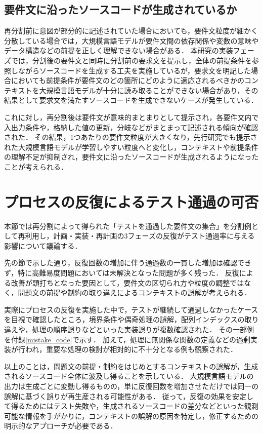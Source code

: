 \documentclass[11pt]{jreport}
\begin{document}
\subsection{要件文に沿ったソースコードが生成されているか}
再分割前に意図が部分的に記述されていた場合においても，要件文粒度が細かく分散している場合では，大規模言語モデルが要件文間の依存関係や変数の意味やデータ構造などの前提を正しく理解できない場合がある．
本研究の実装フェーズでは，分割後の要件文と同時に分割前の要求文を提示し，全体の前提条件を参照しながらソースコードを生成する工夫を実施しているが，要求文を明記した場合においても前提条件が要件文のどの箇所にどのように適応されるべきかのコンテキストを大規模言語モデルが十分に読み取ることができない場合があり，その結果として要求文を満たすソースコードを生成できないケースが発生している．

これに対し，再分割後は要件文が意味的まとまりとして提示され，各要件文内で入出力条件や，格納した値の更新，分岐などがまとまって記述される傾向が確認された．
その結果，1つあたりの要件文粒度が大きくなり，先行研究でも提示された大規模言語モデルが学習しやすい粒度へと変化し，コンテキストや前提条件の理解不足が抑制され，要件文に沿ったソースコードが生成されるようになったことが考えられる．


\section{プロセスの反復によるテスト通過の可否}
本節では再分割によって得られた「テストを通過した要件文の集合」を分割例として再利用し，計画・実装・再計画の3フェーズの反復がテスト通過率に与える影響について議論する．


先の節で示した通り，反復回数の増加に伴う通過数の一貫した増加は確認できず，特に高難易度問題においては未解決となった問題が多く残った．
反復による改善が頭打ちとなった要因として，要件文の区切られ方や粒度の調整ではなく，問題文の前提や制約の取り違えによるコンテキストの誤解が考えられる．

実際にプロセスの反復を実施した中で，テストが継続して通過しなかったケースを目視で確認したところ，境界条件や偶奇処理の誤解，配列インデックスの取り違えや，処理の順序誤りなどといった実装誤りが複数確認された．
その一部例を付録\ref{mistake_code}で示す．
加えて，処理に無関係な関数の定義などの過剰実装が行われ，重要な処理の検討が相対的に不十分となる例も観察された．

以上のことは，問題文の前提・制約をはじめとするコンテキストの誤解が，生成されるソースコード全体に波及し得ることを示している．
大規模言語モデルの出力は生成ごとに変動し得るものの，単に反復回数を増加させただけでは同一の誤解に基づく誤りが再生産される可能性がある．
従って，反復の効果を安定して得るためにはテスト失敗や，生成されるソースコードの差分などといった観測可能な情報を手がかりに，コンテキストの誤解の原因を特定し，修正するための明示的なアプローチが必要である．
\end{document}
